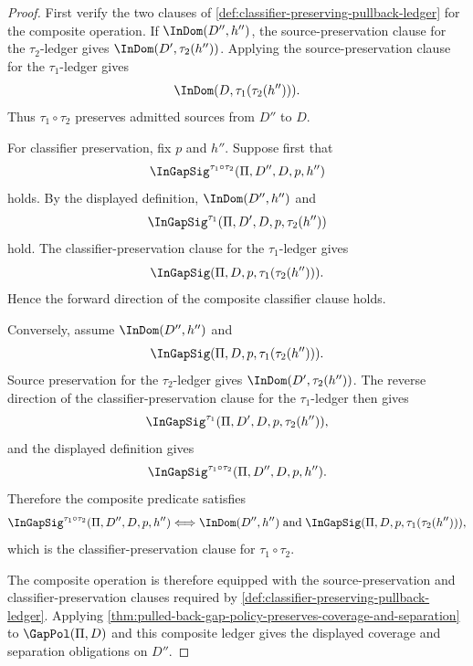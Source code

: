 \begin{proof}
First verify the two clauses of \autoref{def:classifier-preserving-pullback-ledger} for the composite operation. If $\InDom(D'',h'')$, the source-preservation clause for the $\tau_2$-ledger gives $\InDom(D',\tau_2(h''))$. Applying the source-preservation clause for the $\tau_1$-ledger gives
$$
  \InDom(D,\tau_1(\tau_2(h''))).
$$
Thus $\tau_1\circ\tau_2$ preserves admitted sources from $D''$ to $D$.

For classifier preservation, fix $p$ and $h''$. Suppose first that
$$
  {\InGapSig}^{\tau_1\circ\tau_2}(\Pi,D'',D,p,h'')
$$
holds. By the displayed definition, $\InDom(D'',h'')$ and
$$
  {\InGapSig}^{\tau_1}(\Pi,D',D,p,\tau_2(h''))
$$
hold. The classifier-preservation clause for the $\tau_1$-ledger gives
$$
  \InGapSig(\Pi,D,p,\tau_1(\tau_2(h''))).
$$
Hence the forward direction of the composite classifier clause holds.

Conversely, assume $\InDom(D'',h'')$ and
$$
  \InGapSig(\Pi,D,p,\tau_1(\tau_2(h''))).
$$
Source preservation for the $\tau_2$-ledger gives $\InDom(D',\tau_2(h''))$. The reverse direction of the classifier-preservation clause for the $\tau_1$-ledger then gives
$$
  {\InGapSig}^{\tau_1}(\Pi,D',D,p,\tau_2(h'')),
$$
and the displayed definition gives
$$
  {\InGapSig}^{\tau_1\circ\tau_2}(\Pi,D'',D,p,h'').
$$
Therefore the composite predicate satisfies
$$
  {\InGapSig}^{\tau_1\circ\tau_2}(\Pi,D'',D,p,h'')
  \Longleftrightarrow
  \InDom(D'',h'')\;\text{and}\;
  \InGapSig(\Pi,D,p,\tau_1(\tau_2(h''))),
$$
which is the classifier-preservation clause for $\tau_1\circ\tau_2$.

The composite operation is therefore equipped with the source-preservation and classifier-preservation clauses required by \autoref{def:classifier-preserving-pullback-ledger}. Applying \autoref{thm:pulled-back-gap-policy-preserves-coverage-and-separation} to $\GapPol(\Pi,D)$ and this composite ledger gives the displayed coverage and separation obligations on $D''$.
\end{proof}

